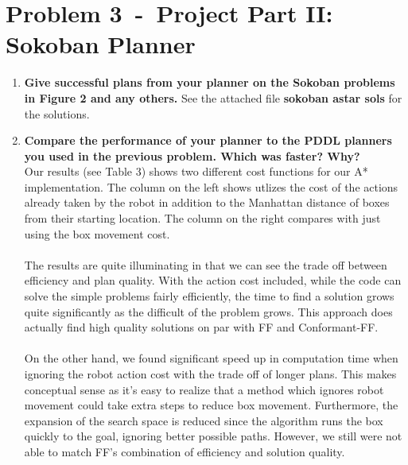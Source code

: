 \documentclass[12pt]{article}
\newcommand{\problem}[2]{\section*{Problem {#1}~-~{#2}}}
\begin{document}
\problem{3}{Project Part II: Sokoban Planner}
\label{sec:problem_3}
\begin{enumerate}
  \item \textbf{Give successful plans from your planner on the Sokoban problems in Figure 2 and any others.} 
  See the attached file \textbf{sokoban astar sols} for the solutions.
 
  \item \textbf{Compare the performance of your planner to the PDDL planners you used in the previous
problem. Which was faster? Why?} \\
Our results (see Table 3) shows two different cost functions for our A* implementation. The column on the left shows utlizes the cost of the actions already taken by the robot in addition to the Manhattan distance of boxes from their starting location. The column on the right compares with just using the box movement cost. \\\\
The results are quite illuminating in that we can see the trade off between efficiency and plan quality. With the action cost included, while the code can solve the simple problems fairly efficiently, the time to find a solution grows quite significantly as the difficult of the problem grows. This approach does actually find high quality solutions on par with FF and Conformant-FF. \\\\
On the other hand, we found significant speed up in computation time when ignoring the robot action cost with the trade off of longer plans. This makes conceptual sense as it's easy to realize that a method which ignores robot movement could take extra steps to reduce box movement.  Furthermore, the expansion of the search space is reduced since the algorithm runs the box quickly to the goal, ignoring better possible paths. However, we still were not able to match FF's combination of efficiency and solution quality.


\end{enumerate}
\end{document}
